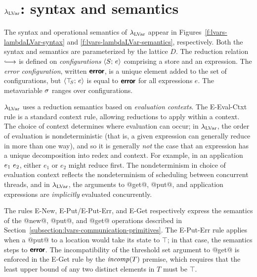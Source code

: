 \section{$\lambda_{\textrm{LVar}}$: syntax and semantics}\label{s:lvars-lambdalvar}


\FigLambdaLVarGrammar

\FigLambdaLVarSemantics

The syntax and operational semantics of $\lambda_{\textrm{LVar}}$ appear in
Figures~\ref{f:lvars-lambdaLVar-syntax} and
\ref{f:lvars-lambdaLVar-semantics}, respectively.  Both the
syntax and semantics are parameterized by the lattice $D$.  The
reduction relation $\parstepsto$ is defined on \emph{configurations}
$\langle S;\, e \rangle$ comprising a store and an expression.  The \emph{error
  configuration}, written $\textbf{\textsf{error}}$, is a unique element added to the
set of configurations, but $\langle \top\hspace{-0.85mm}_{S};\, e \rangle$ is equal to $\textbf{\textsf{error}}$
for all expressions $e$.  The metavariable $\sigma$ ranges over
configurations.

$\lambda_{\textrm{LVar}}$ uses a reduction semantics based on \emph{evaluation
  contexts}.  The {\sc E-Eval-Ctxt} rule is a standard context rule,
allowing reductions to apply within a context.  The choice of context
determines where evaluation can occur; in $\lambda_{\textrm{LVar}}$, the order of
evaluation is nondeterministic (that is, a given expression can
generally reduce in more than one way), and so it is generally
\emph{not} the case that an expression has a unique decomposition into
redex and context.  For example, in an application $e_1~e_2$,
either $e_1$ or $e_2$ might reduce first.  The nondeterminism in
choice of evaluation context reflects the nondeterminism of scheduling
between concurrent threads, and in $\lambda_{\textrm{LVar}}$, the arguments to
@get@, @put@, and application expressions are \emph{implicitly}
evaluated concurrently.

The rules {\sc E-New}, {\sc E-Put}/{\sc E-Put-Err}, and {\sc E-Get}
respectively express the semantics of the @new@, @put@, and @get@
operations described in
Section~\ref{subsection:lvars-communication-primitives}.  The {\sc
  E-Put-Err} rule applies when a @put@ to a location would take its
state to $\top$; in that case, the semantics steps to $\textbf{\textsf{error}}$.  The
incompatibility of the threshold set argument to @get@ is enforced in
the {\sc E-Get} rule by the $\mathit{incomp}(T)$ premise, which requires that
the least upper bound of any two distinct elements in $T$ must be
$\top$.

